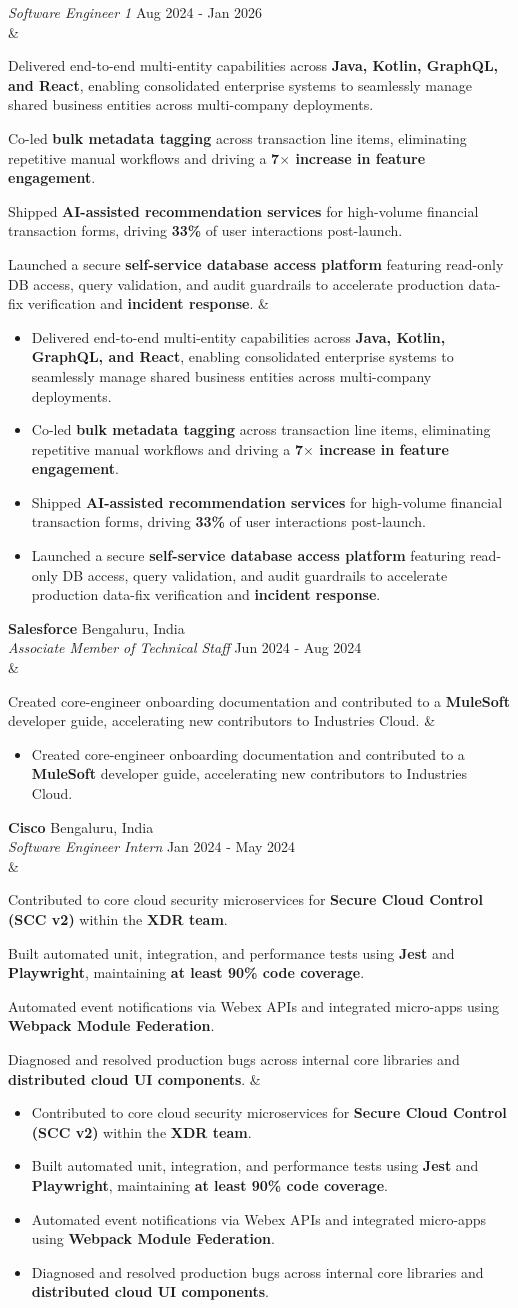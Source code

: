 \documentclass[a4paper]{article}
\newcommand{\bulletSep} { \vspace{1.3mm} }
\newcommand{\experienceCompany}[2]{
    \textbf{#1} \hfill #2 \\
}
\newcommand{\experienceRole}[3]{
    \textit{#1} \hfill #2 \\
    \ifx&#3&%
    \else
    \begin{itemize}
        #3
    \end{itemize}
    \fi
    \vspace{0.75mm}
}
\begin{document}
\experienceRole{Software Engineer 1}{Aug 2024 - Jan 2026}{
    \item Delivered end-to-end multi-entity capabilities across \textbf{Java, Kotlin, GraphQL, and React}, enabling consolidated enterprise systems to seamlessly manage shared business entities across multi-company deployments.
    \item Co-led \textbf{bulk metadata tagging} across transaction line items, eliminating repetitive manual workflows and driving a \textbf{7$\times$ increase in feature engagement}.
    \item Shipped \textbf{AI-assisted recommendation services} for high-volume financial transaction forms, driving \textbf{33\%} of user interactions post-launch.
    \item Launched a secure \textbf{self-service database access platform} featuring read-only DB access, query validation, and audit guardrails to accelerate production data-fix verification and \textbf{incident response}.
}
\bulletSep

\experienceCompany{Salesforce}{Bengaluru, India}
\experienceRole{Associate Member of Technical Staff}{Jun 2024 - Aug 2024}{
    \item Created core-engineer onboarding documentation and contributed to a \textbf{MuleSoft} developer guide, accelerating new contributors to Industries Cloud.
}
\bulletSep

\experienceCompany{Cisco}{Bengaluru, India}
\experienceRole{Software Engineer Intern}{Jan 2024 - May 2024}{
    \item Contributed to core cloud security microservices for \textbf{Secure Cloud Control (SCC v2)} within the \textbf{XDR team}.
    \item Built automated unit, integration, and performance tests using \textbf{Jest} and \textbf{Playwright}, maintaining \textbf{at least 90\% code coverage}.
    \item Automated event notifications via Webex APIs and integrated micro-apps using \textbf{Webpack Module Federation}.
    \item Diagnosed and resolved production bugs across internal core libraries and \textbf{distributed cloud UI components}.
}

\end{document}
